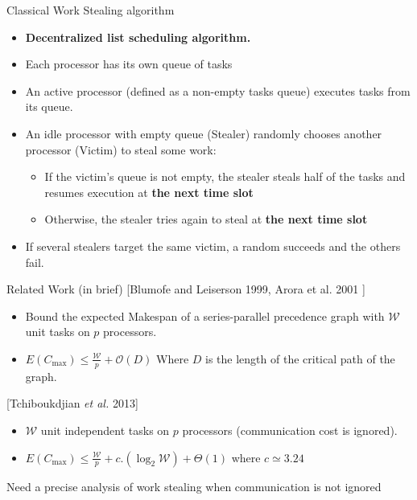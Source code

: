 \documentclass{beamer}
\begin{document}
\begin{frame}{Classical Work Stealing algorithm}

 \begin{itemize}
     \item \textbf{Decentralized list scheduling algorithm.}
        \item { Each processor has its own queue of tasks}                                     
        \item { An active processor (defined as a non-empty tasks queue) executes tasks from its queue.}
        \item { An idle processor with empty queue (\alert{Stealer}) randomly chooses another processor (\alert{Victim}) to steal some work:}                                     
                    \pause
            \begin{itemize}
                \item {If the victim's queue is not empty, the stealer steals half of the tasks and resumes execution at \textbf{the next time slot}}
                \item {Otherwise, the stealer tries again to steal at \textbf{the next time slot}}
            \end{itemize}
        \item {If several stealers target the same victim, a random succeeds and the others fail.} 

    \end{itemize}
\end{frame}


\begin{frame}{Related Work (in brief)}
    \color{blue} {[Blumofe and Leiserson 1999, Arora et al. 2001  ]}
        \begin{itemize}        
            \item Bound the expected Makespan of a series-parallel precedence graph with $\mathcal{W}$ unit tasks on $p$ processors.
             \item $E(C_{\max}) \leq \frac{\mathcal{W}}{p}+\mathcal{O}(D)$  Where $D$ is the length of the \alert{critical path} of the graph.
        \end{itemize}  
    \color{blue} [Tchiboukdjian \textit{et al.} 2013] 
         \begin{itemize}        
             \item $\mathcal{W}$ unit independent tasks on $p$ processors (communication cost is ignored).  
             \item $E(C_{\max}) \leq \frac{\mathcal{W}}{p}+c.(\log_2 \mathcal{W})+\Theta(1)$ where $c \simeq3.24$ 
        \end{itemize}  

        \alert{Need a precise analysis of work stealing when communication is not ignored}
\end{frame}
\end{document}

